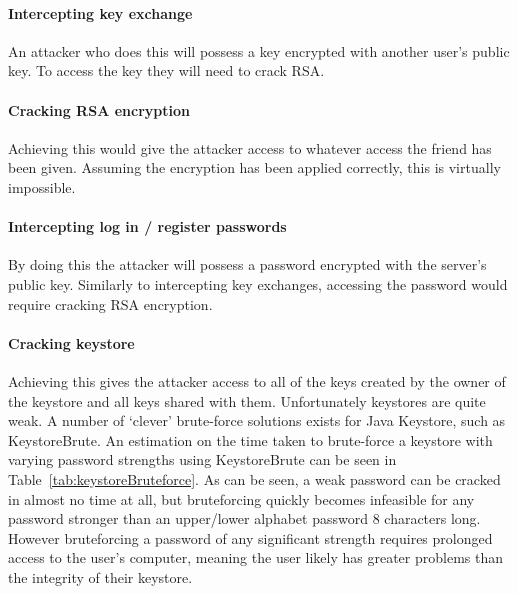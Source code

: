 \documentclass[12pt, titlepage]{article}
\begin{document}
\paragraph*{Intercepting key exchange} An attacker who does this will possess a key encrypted with another user's public key. To access the key they will need to crack RSA.

\paragraph*{Cracking RSA encryption} Achieving this would give the attacker access to whatever access the friend has been given. Assuming the encryption has been applied correctly, this is virtually impossible.

\paragraph*{Intercepting log in / register passwords} By doing this the attacker will possess a password encrypted with the server's public key. Similarly to intercepting key exchanges, accessing the password would require cracking RSA encryption.

\paragraph*{Cracking keystore} Achieving this gives the attacker access to all of the keys created by the owner of the keystore and all keys shared with them. Unfortunately keystores are quite weak. A number of `clever' brute-force solutions exists for Java Keystore, such as KeystoreBrute.\cite{keystoreBrute} An estimation on the time taken to brute-force a keystore with varying password strengths using KeystoreBrute can be seen in Table~\ref{tab:keystoreBruteforce}. As can be seen, a weak password can be cracked in almost no time at all, but bruteforcing quickly becomes infeasible for any password stronger than an upper/lower alphabet password 8 characters long. However bruteforcing a password of any significant strength requires prolonged access to the user's computer, meaning the user likely has greater problems than the integrity of their keystore.
\end{document}
